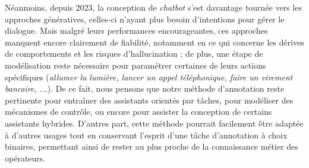 		Néanmoins, depuis $2023$, la conception de \textit{chatbot} s'est davantage tournée vers les approches génératives, celles-ci n'ayant plus besoin d'intentions pour gérer le dialogue.
		Mais malgré leurs performances encourageantes, ces approches manquent encore clairement de fiabilité, notamment en ce qui concerne les dérives de comportements et les risques d'hallucination ; de plus, une étape de modélisation reste nécessaire pour paramétrer certaines de leurs actions spécifiques (\textit{allumer la lumière, lancer un appel téléphonique, faire un virement bancaire, ...}).
		De ce fait, nous pensons que notre méthode d'annotation reste pertinente pour entraîner des assistants orientés par tâches, pour modéliser des mécanismes de contrôle, ou encore pour assister la conception de certains assistants hybrides.
		D'autres part, cette méthode pourrait facilement être adaptée à d'autres usages tout en conservant l'esprit d'une tâche d'annotation à choix binaires, permettant ainsi de rester au plus proche de la connaissance métier des opérateurs.
		
